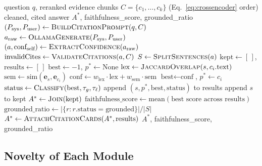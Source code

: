 \documentclass[conference]{IEEEtran}
\begin{document}
\begin{algorithm}[t]
\caption{Grounded Answer Generation (as implemented across \texttt{citation\_prompt\_builder.py}, \texttt{llm\_generator.py}, \texttt{sentence\_grounder.py}, \texttt{evidence\_grounding.py})}
\label{alg:grounded-gen}
\begin{algorithmic}[1]
\Require question $q$, reranked evidence chunks $C = \{c_1,\ldots,c_k\}$ (Eq.~\ref{eq:crossencoder} order)
\Ensure cleaned, cited answer $A^*$, faithfulness\_score, grounded\_ratio
\State $(P_{\text{sys}}, P_{\text{user}}) \gets \Call{BuildCitationPrompt}{q, C}$ 
\State $a_{\text{raw}} \gets \Call{OllamaGenerate}{P_{\text{sys}}, P_{\text{user}}}$ 
\State $(a, \text{conf}_{\text{self}}) \gets \Call{ExtractConfidence}{a_{\text{raw}}}$ 
\State $\text{invalidCites} \gets \Call{ValidateCitations}{a, C}$ 
\State $S \gets \Call{SplitSentences}{a}$
\State $\text{kept} \gets [\,]$, $\text{results} \gets [\,]$
    \State $\text{best} \gets -1$, $p^* \gets \text{None}$
        \State $\text{lex} \gets \Call{JaccardOverlap}{s, c_i.\text{text}}$
        \State $\text{sem} \gets \text{sim}(\mathbf{e}_s, \mathbf{e}_{c_i})$ 
        \State $\text{conf} \gets w_{\text{lex}} \cdot \text{lex} + w_{\text{sem}} \cdot \text{sem}$ 
            \State $\text{best} \gets \text{conf}$, $p^* \gets c_i$
        \EndIf
    \EndFor
    \State $\text{status} \gets \Call{Classify}{\text{best}, \tau_g, \tau_\ell}$ 
    \State append $(s, p^*, \text{best}, \text{status})$ to results
        \State append $s$ to kept
    \EndIf
\EndFor
\State $A^* \gets \Call{Join}{\text{kept}}$
\State $\text{faithfulness\_score} \gets \text{mean}(\text{best score across results})$
\State $\text{grounded\_ratio} \gets |\{r : r.\text{status} = \text{grounded}\}| / |S|$
\State $A^* \gets \Call{AttachCitationCards}{A^*, \text{results}}$ 
\State \Return $A^*$, faithfulness\_score, grounded\_ratio
\end{algorithmic}
\end{algorithm}

\subsection{Novelty of Each Module}
\end{document}
